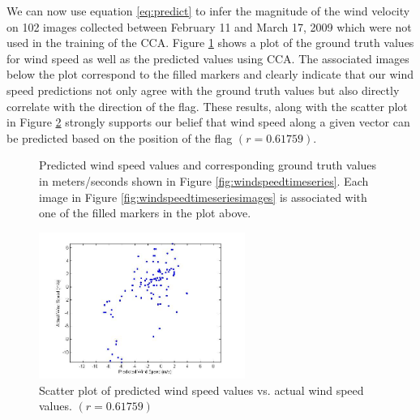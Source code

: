 We can now use equation \ref{eq:predict} to infer the magnitude of the wind velocity on 102 images collected between February 11 and March 17, 2009 which were not used in the training of the CCA. Figure \ref{fig:windpred} shows a plot of the ground truth values for wind speed as well as the predicted values using CCA. The associated images below the plot correspond to the filled markers and clearly indicate that our wind speed predictions not only agree with the ground truth values but also directly correlate with the direction of the flag. These results, along with the scatter plot in Figure \ref{fig:windspeedcorr} strongly supports our belief that wind speed along a given vector can be predicted based on the position of the flag  $(r=0.61759)$.
\begin{figure}
	\centering
	\caption{Predicted wind speed values and corresponding ground truth values in meters/seconds shown in Figure \ref{fig:windspeedtimeseries}. Each image in Figure \ref{fig:windspeedtimeseriesimages} is associated with one of the filled markers in the plot above.}
	\label{fig:windpred}
\end{figure}
\begin{figure}
	\centering
		\includegraphics[width=0.60\textwidth]{figures/windspeedcorr.jpg}
	\caption{Scatter plot of predicted wind speed values vs. actual wind speed values. $(r=0.61759)$}
	\label{fig:windspeedcorr}
\end{figure}

